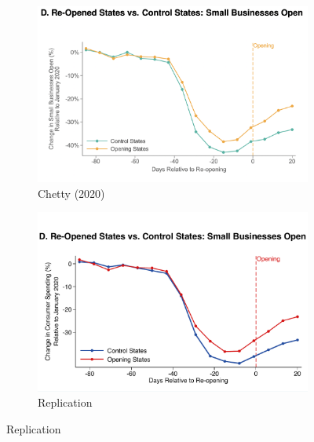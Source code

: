 \documentclass[12pt,letterpaper]{article}
\begin{document}
\begin{figure}
    \centering
    \caption{}
    \begin{subfigure}[t]{0.8\textwidth}
        \centering
        \includegraphics[width=\linewidth]{ChettySmallBusinessGraph.png} 
        \caption{Chetty (2020)} 
        \label{fig:merchantsC}
    \end{subfigure}

    \begin{subfigure}[t]{0.8\textwidth}
        \centering
        \includegraphics[width=\linewidth]{SmallBusinessGraph.pdf} 
        \caption{Replication} 
        \label{fig:merchants}
    \end{subfigure}
\end{figure}
\end{document}
